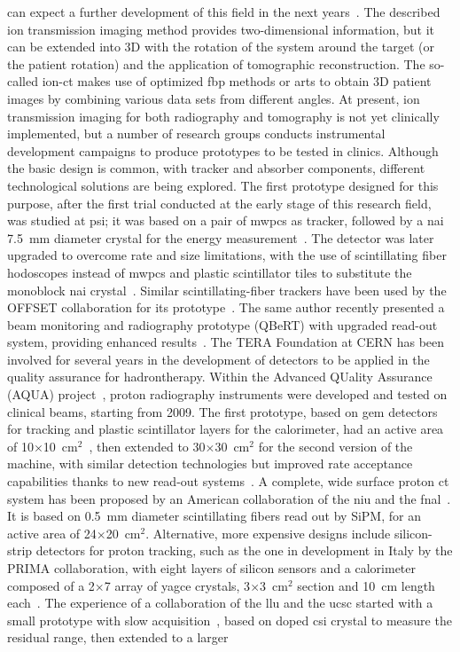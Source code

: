 can expect a further development of this field in the next years~\parencite{Parodi2014}.
The described ion transmission imaging method provides two-dimensional information, but it can be extended into 3D with the rotation of the system around the target (or the patient rotation) and the application of tomographic reconstruction. The so-called ion-\gls{ct} makes use of optimized \gls{fbp} methods or \glspl{art} to obtain 3D patient images by combining various data sets from different angles.
At present, ion transmission imaging for both radiography and tomography is not yet clinically implemented, but a number of research groups conducts instrumental development campaigns to produce prototypes to be tested in clinics. Although the basic design is common, with tracker and absorber components, different technological solutions are being explored. The first prototype designed for this purpose, after the first trial conducted at the early stage of this research field, was studied at \gls{psi}; it was based on a pair of \glspl{mwpc} as tracker, followed by a \gls{nai} 7.5~mm diameter crystal for the energy measurement~\parencite{Schneider1995}. The detector was later upgraded to overcome rate and size limitations, with the use of scintillating fiber hodoscopes instead of \glspl{mwpc} and plastic scintillator tiles to substitute the monoblock \gls{nai} crystal~\parencite{Pemler1999}. Similar scintillating-fiber trackers have been used by the OFFSET collaboration for its prototype~\parencite{Lopresti2014}. The same author recently presented a beam monitoring and radiography prototype (QBeRT) with upgraded read-out system, providing enhanced results~\parencite{Lopresti2016, Gallo2016}. The TERA Foundation at CERN has been involved for several years in the development of detectors to be applied in the quality assurance for hadrontherapy. Within the Advanced QUality Assurance (AQUA) project~\parencite{Amaldi2010b}, proton radiography instruments were developed and tested on clinical beams, starting from 2009. The first prototype, based on \gls{gem} detectors~\parencite{Sauli1997} for tracking and plastic scintillator layers for the calorimeter, had an active area of 10$\times$10~cm$^2$~\parencite{Amaldi2011}, then extended to 30$\times$30~cm$^2$ for the second version of the machine, with similar detection technologies but improved rate acceptance capabilities thanks to new read-out systems~\parencite{Bucciantonio2013, BucciantonioPhD2015}. A complete, wide surface proton \gls{ct} system has been proposed by an American collaboration of the \gls{niu} and the \gls{fnal}~\parencite{Naimuddin2016}. It is based on 0.5~mm diameter scintillating fibers read out by SiPM, for an active area of 24$\times$20~cm$^2$. Alternative, more expensive designs include silicon-strip detectors for proton tracking, such as the one in development in Italy by the PRIMA collaboration, with eight layers of silicon sensors and a calorimeter composed of a 2$\times$7 array of \gls{yagce} crystals, 3$\times$3~cm$^2$ section and 10~cm length each~\parencite{Scaringella2013}. The experience of a collaboration of the \gls{llu} and the \gls{ucsc} started with a small prototype with slow acquisition~\parencite{Sadrozinsky2011}, based on doped \gls{csi} crystal to measure the residual range, then extended to a larger 
